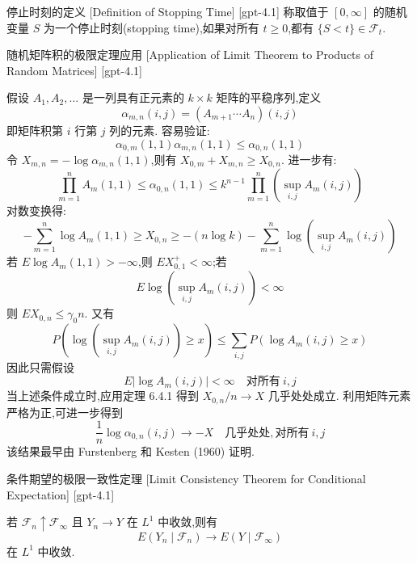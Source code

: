 \documentclass[UTF8]{ctexart}
\begin{document}
    
    
    \begin{dfn}
        {停止时刻的定义}
        [Definition of Stopping Time]
        [gpt-4.1]
        称取值于 $[0, \infty]$ 的随机变量 $S$ 为一个停止时刻(stopping time),如果对所有 $t \geq 0$,都有 $\{ S < t \} \in \mathcal{F}_t$.
    \end{dfn}
    
    
    
    \begin{xmp}
        {随机矩阵积的极限定理应用}
        [Application of Limit Theorem to Products of Random Matrices]
        [gpt-4.1]
        
假设 $A_{1}, A_{2}, \ldots$ 是一列具有正元素的 $k \times k$ 矩阵的平稳序列,定义
\[
\alpha_{m,n}(i,j) = ( A_{m+1} \cdots A_{n} )(i,j)
\]
即矩阵积第 $i$ 行第 $j$ 列的元素.
容易验证:
\[
\alpha_{0,m}(1,1) \alpha_{m,n}(1,1) \leq \alpha_{0,n}(1,1)
\]
令 $X_{m,n} = - \log \alpha_{m,n}(1,1)$,则有 $X_{0,m} + X_{m,n} \geq X_{0,n}$.
进一步有:
\[
\prod_{m=1}^{n} A_{m}(1,1) \leq \alpha_{0,n}(1,1) \leq k^{n-1} \prod_{m=1}^{n} \left( \sup_{i,j} A_{m}(i,j) \right)
\]
对数变换得:
\[
- \sum_{m=1}^{n} \log A_{m}(1,1) \geq X_{0,n} \geq - ( n \log k ) - \sum_{m=1}^{n} \log \left( \sup_{i,j} A_{m}(i,j) \right)
\]
若 $E \log A_{m}(1,1) > -\infty$,则 $E X_{0,1}^{+} < \infty$;若
\[
E \log \left( \sup_{i,j} A_{m}(i,j) \right) < \infty
\]
则 $E X_{0,n} \leq \gamma_{0} n$.
又有
\[
P\left( \log\left( \sup_{i,j} A_{m}(i,j) \right) \geq x \right) \leq \sum_{i,j} P \left( \log A_{m}(i,j) \geq x \right)
\]
因此只需假设
\[
E | \log A_{m}(i,j) | < \infty \quad \mathrm{对所有}~ i,j
\]
当上述条件成立时,应用定理 6.4.1 得到 $X_{0,n}/n \to X$ 几乎处处成立.
利用矩阵元素严格为正,可进一步得到
\[
\frac{1}{n} \log \alpha_{0,n}(i,j) \to -X \quad \mathrm{几乎处处,对所有}~ i,j
\]
该结果最早由 Furstenberg 和 Kesten (1960) 证明.

    \end{xmp}
    
    
    
    \begin{thm}
        {条件期望的极限一致性定理}
        [Limit Consistency Theorem for Conditional Expectation]
        [gpt-4.1]
        
若 ${\mathcal{F}}_{n} \uparrow \mathcal{F}_{\infty}$ 且 $Y_{n} \to Y$ 在 $L^{1}$ 中收敛,则有
\[
E(Y_{n} \mid \mathcal{F}_{n}) \to E(Y \mid \mathcal{F}_{\infty})
\]
在 $L^{1}$ 中收敛.

    \end{thm}
    
\end{document}
